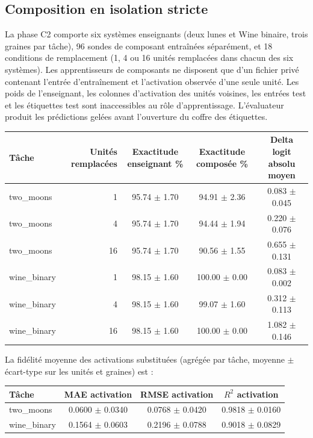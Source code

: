 \documentclass[11pt,a4paper]{article}
\begin{document}
\subsection{Composition en isolation stricte}
La phase C2 comporte six systèmes enseignants (deux lunes et Wine binaire, trois graines par tâche), 96 sondes de composant entraînées séparément, et 18 conditions de remplacement (1, 4 ou 16 unités remplacées dans chacun des six systèmes). Les apprentisseurs de composants ne disposent que d'un fichier privé contenant l'entrée d'entraînement et l'activation observée d'une seule unité. Les poids de l'enseignant, les colonnes d'activation des unités voisines, les entrées test et les étiquettes test sont inaccessibles au rôle d'apprentissage. L'évaluateur produit les prédictions gelées avant l'ouverture du coffre des étiquettes.

\begin{center}\scriptsize
\begin{longtable}{l r c c c}
\toprule
\textbf{Tâche} & \textbf{Unités remplacées} & \textbf{Exactitude enseignant \%} & \textbf{Exactitude composée \%} & \textbf{Delta logit absolu moyen}\\
\midrule\endhead
two\_moons & 1 & 95.74 $\pm$ 1.70 & 94.91 $\pm$ 2.36 & 0.083 $\pm$ 0.045 \\
two\_moons & 4 & 95.74 $\pm$ 1.70 & 94.44 $\pm$ 1.94 & 0.220 $\pm$ 0.076 \\
two\_moons & 16 & 95.74 $\pm$ 1.70 & 90.56 $\pm$ 1.55 & 0.655 $\pm$ 0.131 \\
wine\_binary & 1 & 98.15 $\pm$ 1.60 & 100.00 $\pm$ 0.00 & 0.083 $\pm$ 0.002 \\
wine\_binary & 4 & 98.15 $\pm$ 1.60 & 99.07 $\pm$ 1.60 & 0.312 $\pm$ 0.113 \\
wine\_binary & 16 & 98.15 $\pm$ 1.60 & 100.00 $\pm$ 0.00 & 1.082 $\pm$ 0.146 \\
\bottomrule
\end{longtable}
\end{center}

La fidélité moyenne des activations substituées (agrégée par tâche, moyenne $\pm$ écart-type sur les unités et graines) est :
\begin{center}\scriptsize
\begin{tabular}{lccc}\toprule
\textbf{Tâche} & \textbf{MAE activation} & \textbf{RMSE activation} & \textbf{$R^2$ activation}\\\midrule
two\_moons & 0.0600 $\pm$ 0.0340 & 0.0768 $\pm$ 0.0420 & 0.9818 $\pm$ 0.0160 \\
wine\_binary & 0.1564 $\pm$ 0.0603 & 0.2196 $\pm$ 0.0788 & 0.9018 $\pm$ 0.0829 \\
\bottomrule\end{tabular}
\end{center}
\end{document}
